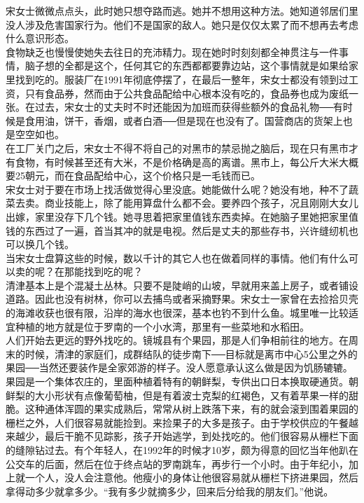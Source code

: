 宋女士微微点点头，此时她只想夺路而逃。她并不想用这种方法。她知道邻居们里没人涉及危害国家行为。他们不是国家的敌人。她只是仅仅太累了而不想再去考虑什么意识形态。\\

食物缺乏也慢慢使她失去往日的充沛精力。现在她时时刻刻都全神贯注与一件事情，脑子想的全都是这个，任何其它的东西都都要靠边站，这个事情就是如果给家里找到吃的。服装厂在1991年彻底停摆了，在最后一整年，宋女士都没有领到过工资，只有食品券，然而由于公共食品配给中心根本没有吃的，食品券也成为废纸一张。在过去，宋女士的丈夫时不时还能因为加班而获得些额外的食品礼物──有时候是食用油，饼干，香烟，或者白酒──但是现在也没有了。国营商店的货架上也是空空如也。\\

在工厂关门之后，宋女士不得不将自己的对黑市的禁忌抛之脑后，现在只有黑市才有食物，有时候甚至还有大米，不是价格确是高的离谱。黑市上，每公斤大米大概要25朝元，而在食品配给中心，这个价格只是一毛钱而已。\\

宋女士对于要在市场上找活做觉得心里没底。她能做什么呢？她没有地，种不了蔬菜去卖。商业技能上，除了能用算盘什么都不会。要养四个孩子，况且刚刚大女儿出嫁，家里没存下几个钱。她寻思着把家里值钱东西卖掉。在她脑子里她把家里值钱的东西过了一遍，首当其冲的就是电视。然后是丈夫的那些存书，兴许缝纫机也可以换几个钱。\\

当宋女士盘算这些的时候，数以千计的其它人也在做着同样的事情。他们有什么可以卖的呢？在那能找到吃的呢？\\

清津基本上是个混凝土丛林。只要不是陡峭的山坡，早就用来盖上房子，或者铺设道路。因此也没有树林，你可以去捕鸟或者采摘野果。宋女士一家曾在去捡拾贝壳的海滩收获也很有限，沿岸的海水也很深，基本也钓不到什么鱼。城里唯一比较适宜种植的地方就是位于罗南的一个小水湾，那里有一些菜地和水稻田。\\

人们开始去更远的野外找吃的。镜城县有个果园，那是人们争相前往的地方。在周末的时候，清津的家庭们，成群结队的徒步南下──目标就是离市中心5公里之外的果园──当然还要装作是全家郊游的样子。没人愿意承认这么做是因为饥肠辘辘。果园是一个集体农庄的，里面种植着特有的朝鲜梨，专供出口日本换取硬通货。朝鲜梨的大小形状有点像葡萄柚，但是有着波士克梨的红褐色，又有着苹果一样的甜脆。这种通体浑圆的果实成熟后，常常从树上跌落下来，有的就会滚到围着果园的栅栏之外，人们很容易就能捡到。来捡果子的大多是孩子。由于学校供应的午餐越来越少，最后干脆不见踪影，孩子开始逃学，到处找吃的。他们很容易从栅栏下面的缝隙钻过去。有个年轻人，在1992年的时候才10岁，颇为得意的回忆当年他趴在公交车的后面，然后在位于终点站的罗南跳车，再步行一个小时。由于年纪小，加上就一个人，没人会注意他。他瘦小的身体让他很容易就从栅栏下挤进果园，然后拿得动多少就拿多少。“我有多少就摘多少，回来后分给我的朋友们。”他说。\\

